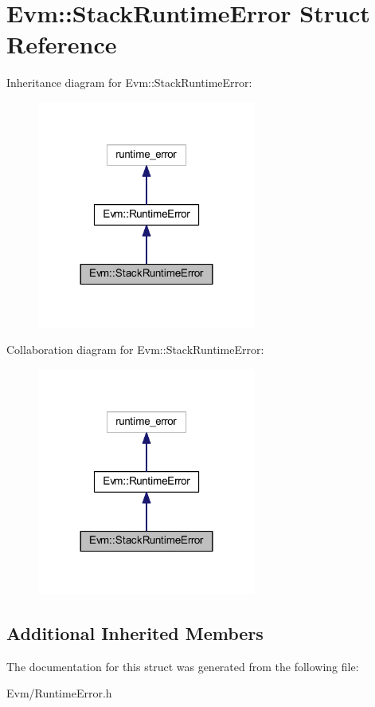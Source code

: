 \hypertarget{struct_evm_1_1_stack_runtime_error}{}\section{Evm\+:\+:Stack\+Runtime\+Error Struct Reference}
\label{struct_evm_1_1_stack_runtime_error}


Inheritance diagram for Evm\+:\+:Stack\+Runtime\+Error\+:
\nopagebreak
\begin{figure}[H]
\begin{center}
\leavevmode
\includegraphics[width=204pt]{struct_evm_1_1_stack_runtime_error__inherit__graph}
\end{center}
\end{figure}


Collaboration diagram for Evm\+:\+:Stack\+Runtime\+Error\+:
\nopagebreak
\begin{figure}[H]
\begin{center}
\leavevmode
\includegraphics[width=204pt]{struct_evm_1_1_stack_runtime_error__coll__graph}
\end{center}
\end{figure}
\subsection*{Additional Inherited Members}


The documentation for this struct was generated from the following file\+:\begin{DoxyCompactItemize}
\item 
Evm/Runtime\+Error.\+h\end{DoxyCompactItemize}
